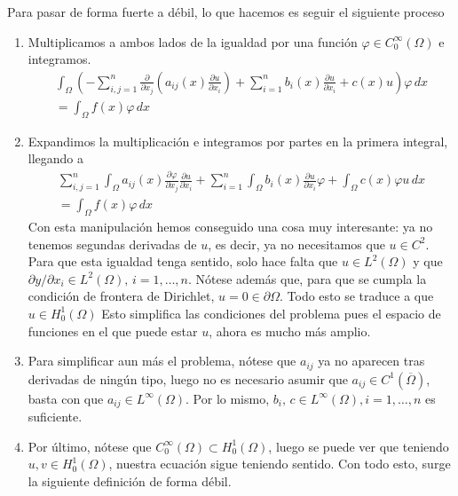 \documentclass[a4paper,11pt,spanish, twoside, leqno]{tfg-uam}
\theoremstyle{definition}
\begin{document}
Para pasar de forma fuerte a débil, lo que hacemos es seguir el siguiente proceso
\begin{enumerate}
    \item Multiplicamos a ambos lados de la igualdad por una función $\varphi \in C^\infty_0(\Omega)$ e integramos.
    \begin{align*}
        \int_\Omega\left(-\sum_{i,j=1}^{n} \frac{\partial}{\partial x_j}\left( a_{ij}(x)\frac{\partial u}{\partial x_i}\right) + \sum_{i=1}^{n} b_i(x)\frac{\partial u}{\partial x_i} + c(x)u \right) \varphi  \,dx\\ =\int_\Omega f(x)\varphi  \,dx
    \end{align*}
    \item Expandimos la multiplicación e integramos por partes en la primera integral, llegando a
    \begin{align*}
        \sum_{i,j=1}^{n} \int_\Omega a_{ij}(x) \frac{\partial \varphi }{\partial x_j} \frac{\partial u}{\partial x_i} + \sum_{i=1}^{n} \int_\Omega b_i(x)\frac{\partial u}{\partial x_i}\varphi  + \int_\Omega c(x)\varphi u  \,dx\\ =\int_\Omega f(x)\varphi  \,dx
    \end{align*}
    Con esta manipulación hemos conseguido una cosa muy interesante: ya no tenemos segundas derivadas de $u$, es decir, ya no necesitamos que $u\in C^2$. Para que esta igualdad tenga sentido, solo hace falta que $u\in L^2(\Omega)$ y que $\partial y /\partial x_i \in L^2(\Omega),\, i =1,\dots,n$. Nótese además que, para que se cumpla la condición de frontera de Dirichlet, $u=0 \in \partial\Omega$. Todo esto se traduce a que $u\in H_0^1(\Omega)$ Esto simplifica las condiciones del problema pues el espacio de funciones en el que puede estar $u$, ahora es mucho más amplio.
    \item Para simplificar aun más el problema, nótese que $a_{ij}$ ya no aparecen tras derivadas de ningún tipo, luego no es necesario asumir que $a_{ij}\in C^1(\overline{\Omega})$, basta con que $a_{ij}\in L^\infty(\Omega)$. Por lo mismo, $b_i,\,c\in L^\infty(\Omega), i=1,\dots,n$ es suficiente.
    \item Por último, nótese que $C^\infty_0(\Omega) \subset H^1_0(\Omega)$, luego se puede ver que teniendo $u,v\in H^1_0(\Omega)$, nuestra ecuación sigue teniendo sentido. Con todo esto, surge la siguiente definición de forma débil.
\end{enumerate}
\end{document}
